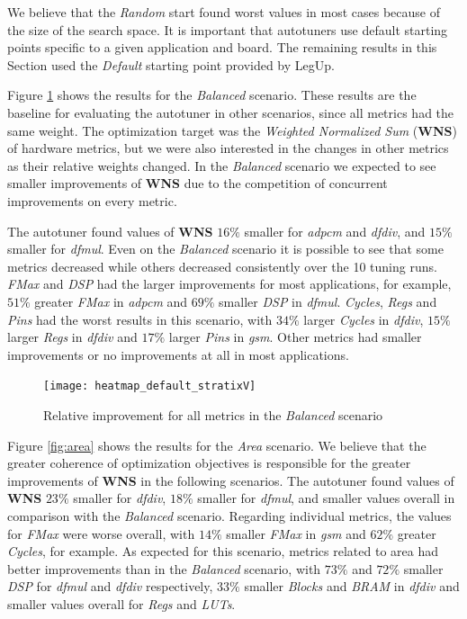 We believe that the \textit{Random} start found worst values in most cases
because of the size of the search space. It is important that autotuners use
default starting points specific to a given application and board.  The
remaining results in this Section used the \textit{Default} starting point
provided by LegUp.

Figure \ref{fig:balanced} shows the results for the \textit{Balanced} scenario.
These results are the baseline for evaluating the autotuner in other scenarios,
since all metrics had the same weight.  The optimization target was the
\textit{Weighted Normalized Sum} (\textbf{WNS}) of hardware metrics, but we
were also interested in the changes in other metrics as their relative weights
changed. In the \textit{Balanced} scenario we expected to see smaller
improvements of \textbf{WNS} due to the competition of concurrent improvements
on every metric.

The autotuner found values of \textbf{WNS} $16\%$ smaller for \textit{adpcm}
and \textit{dfdiv}, and $15\%$ smaller for \textit{dfmul}.  Even on the
\textit{Balanced} scenario it is possible to see that some metrics decreased
while others decreased consistently over the 10 tuning runs. \textit{FMax} and
\textit{DSP} had the larger improvements for most applications, for example,
$51\%$ greater \textit{FMax} in \textit{adpcm} and $69\%$ smaller \textit{DSP}
in \textit{dfmul}.  \textit{Cycles}, \textit{Regs} and \textit{Pins} had the
worst results in this scenario, with $34\%$ larger \textit{Cycles} in
\textit{dfdiv}, $15\%$ larger \textit{Regs} in \textit{dfdiv} and $17\%$ larger
\textit{Pins} in \textit{gsm}.  Other metrics had smaller improvements or no
improvements at all in most applications.

\begin{figure}[htpb]
    \centering
    \texttt{[image: heatmap\_default\_stratixV]}
    \caption{Relative improvement for all metrics in the \textit{Balanced} scenario}
    \label{fig:balanced}
\end{figure}

Figure \ref{fig:area} shows the results for the \textit{Area} scenario.  We
believe that the greater coherence of optimization objectives is responsible
for the greater improvements of \textbf{WNS} in the following scenarios. The
autotuner found values of \textbf{WNS} $23\%$ smaller for \textit{dfdiv},
$18\%$ smaller for \textit{dfmul}, and smaller values overall in comparison
with the \textit{Balanced} scenario. Regarding individual metrics, the values
for \textit{FMax} were worse overall, with $14\%$ smaller \textit{FMax} in
\textit{gsm} and $62\%$ greater \textit{Cycles}, for example. As expected for
this scenario, metrics related to area had better improvements than in the
\textit{Balanced} scenario, with $73\%$ and $72\%$ smaller \textit{DSP} for
\textit{dfmul} and \textit{dfdiv} respectively, $33\%$ smaller \textit{Blocks}
and \textit{BRAM} in \textit{dfdiv} and smaller values overall for
\textit{Regs} and \textit{LUTs}.


